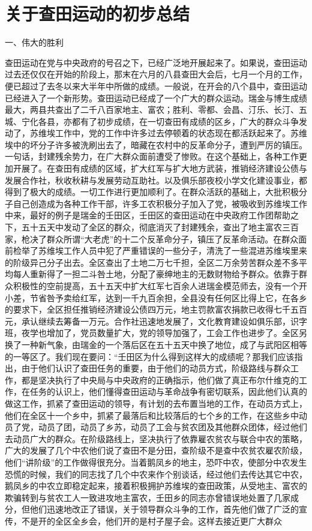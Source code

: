 \section[关于查田运动的初步总结（一九三三年）]{关于查田运动的初步总结}


一、伟大的胜利

查田运动在党与中央政府的号召之下，已经广泛地开展起来了。如果说，查田运动过去还仅仅在开始的阶段上，那末在六月的八县查田大会后，七月一个月的工作，便已超过了去冬以来大半年中所做的成绩。一般说，在开会的八个县中，查田运动已经进入了一个新形势。查田运动已经成了一个广大的群众运动。瑞金与博生成绩最大，两县共查出了二千八百家地主、富农；胜利、零都、会昌、汀乐、长汀、五城、宁化各县，亦都有了初步成绩，在一切查田有成绩的区乡，广大的群众斗争发动了，苏维埃工作中，党的工作中许多过去停顿着的状态现在都活跃起来了。苏维埃中的坏分子许多被洗刷出去了，暗藏在农村中的反革命分子，遭到严厉的镇压。一句话，封建残余势力，在广大群众面前遭受了惨败。在这个基础上，各种工作更加开展了。在查田有成绩的区域，扩大红军与扩大地方武装，推销经济建设公债与发展合作社，秋收秋耕与发展劳动互助社。以及俱乐部夜校小学文化建设事业，都得到了极大的成绩。一切工作进行更加顺利了。在群众活跃的基础上，大批积极分子自己创造成为各种工作干部，许多工农积极分子加入了党，被吸收到苏维埃工作中来，最好的例子是瑞金的壬田区，壬田区的查田运动在中央政府工作团帮助之下，五十五天中发动了全区的群众，彻底消灭了封建残余，查出了地主富农三百家，枪决了群众所谓“大老虎”的十二个反革命分子，镇压了反革命活动。在群众面前检举了苏维埃工作人员中犯了严重错误的一些分子，清洗了一些混进苏维埃里来的阶级异己分子出去。全区查出了土地二万七千担，全区二万余劳苦群众差不多平均每人重新得了一担二斗咎土地，分配了豪绅地主的无数财物给予群众。依靠于群众积极性的空前提高，五十五天中扩大红军七百余人进瑞金模范师去，没有一个开小差，节省咎予卖给红军，达到一千九百余担，全县没有任何区比得上它，在各乡的要求下，全区担任推销经济建设公债四万元，地主罚款富农捐款已收得七千五百元，承认继续去筹备一万元。合作社迅速地发展了，文化教育建设如俱乐部，识字班，夜学也增加了，党员数量扩大，党的领导加强了，工会工作也进步了。全区另换了一种新气象，由瑞金的一个落后区在五十五天中换了地位，成了与武阳区相等的一等区了。我们现在要问：“壬田区为什么得到这样大的成绩呢？那我们应该指出，由于他们认识了查田任务的重要，由于他们的动员方式，阶级路线与群众工作，都是坚决执行了中央局与中央政府的正确指示，他们做了真正布尔什维克的工作，在任务的认识上，他们懂得查田运动与革命战争有密切联系，因此他们认真的做这工作，抓紧了查田运动的领导，有计划的去布置当地的工作，在动员方式上，他们在全区十一个乡中，抓紧了最落后和比较落后的七个乡的工作，在这些乡中动员了党，动员了团，动员了乡苏，动员了工会与贫农团及其他群众团体，经过他们去动员广大的群众。在阶级路线上，坚决执行了依靠雇农贫农与联合中农的策略，广大的发展了几个中农他们说了查田不是分田，查阶级不是查中农贫农雇农阶级，他们“讲阶级”的工作做得很充分。当着鹅凤乡的地主，恐吓中农，使部分中农发生恐慌的时候，我们的同志找了几个中农来作个别谈话，经过他们去传达其它中农，鹅凤乡的中农立即稳定起来，接着积极拥护苏维埃的查田政策，从受地主、富农的欺骗转到与贫农工人一致进攻地主富农，壬田乡的同志亦曾错误地处置了几家成分，但他们迅速地改正了错误，关于领导群众斗争的工作，首先他们做了广泛的宣传，不是开的全区全乡会，他们开的是村子屋子会。这样去接近更广大群众